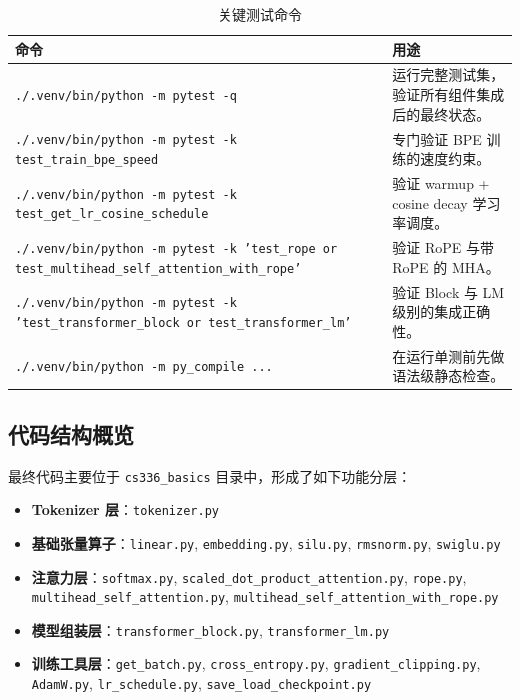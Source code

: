 \documentclass[UTF8,a4paper,11pt]{ctexart}
\begin{document}
\begin{table}[H]
\centering
\caption{关键测试命令}
\label{tab:key-commands}
\begin{tabular}{p{} p{}}
\toprule
命令 & 用途 \\
\midrule
\texttt{./.venv/bin/python -m pytest -q} & 运行完整测试集，验证所有组件集成后的最终状态。 \\
\texttt{./.venv/bin/python -m pytest -k test\_train\_bpe\_speed} & 专门验证 BPE 训练的速度约束。 \\
\texttt{./.venv/bin/python -m pytest -k test\_get\_lr\_cosine\_schedule} & 验证 warmup + cosine decay 学习率调度。 \\
\texttt{./.venv/bin/python -m pytest -k 'test\_rope or test\_multihead\_self\_attention\_with\_rope'} & 验证 RoPE 与带 RoPE 的 MHA。 \\
\texttt{./.venv/bin/python -m pytest -k 'test\_transformer\_block or test\_transformer\_lm'} & 验证 Block 与 LM 级别的集成正确性。 \\
\texttt{./.venv/bin/python -m py\_compile ...} & 在运行单测前先做语法级静态检查。 \\
\bottomrule
\end{tabular}
\end{table}

\subsection{代码结构概览}
最终代码主要位于 \texttt{cs336\_basics} 目录中，形成了如下功能分层：
\begin{itemize}[leftmargin=2em]
  \item \textbf{Tokenizer 层}：\texttt{tokenizer.py}
  \item \textbf{基础张量算子}：\texttt{linear.py}, \texttt{embedding.py}, \texttt{silu.py}, \texttt{rmsnorm.py}, \texttt{swiglu.py}
  \item \textbf{注意力层}：\texttt{softmax.py}, \texttt{scaled\_dot\_product\_attention.py}, \texttt{rope.py}, \texttt{multihead\_self\_attention.py}, \texttt{multihead\_self\_attention\_with\_rope.py}
  \item \textbf{模型组装层}：\texttt{transformer\_block.py}, \texttt{transformer\_lm.py}
  \item \textbf{训练工具层}：\texttt{get\_batch.py}, \texttt{cross\_entropy.py}, \texttt{gradient\_clipping.py}, \texttt{AdamW.py}, \texttt{lr\_schedule.py}, \texttt{save\_load\_checkpoint.py}
\end{itemize}
\end{document}
